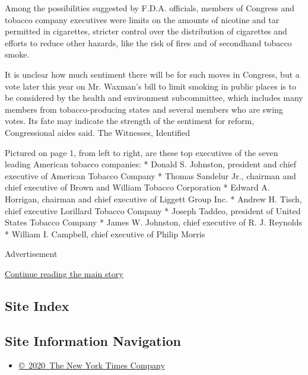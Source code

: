 Among the possibilities suggested by F.D.A. officials, members of
Congress and tobacco company executives were limits on the amounts of
nicotine and tar permitted in cigarettes, stricter control over the
distribution of cigarettes and efforts to reduce other hazards, like the
risk of fires and of secondhand tobacco smoke.

It is unclear how much sentiment there will be for such moves in
Congress, but a vote later this year on Mr. Waxman's bill to limit
smoking in public places is to be considered by the health and
environment subcommittee, which includes many members from
tobacco-producing states and several members who are swing votes. Its
fate may indicate the strength of the sentiment for reform,
Congressional aides said. The Witnesses, Identified

Pictured on page 1, from left to right, are these top executives of the
seven leading American tobacco companies: * Donald S. Johnston,
president and chief executive of American Tobacco Company * Thomas
Sandelur Jr., chairman and chief executive of Brown and William Tobacco
Corporation * Edward A. Horrigan, chairman and chief executive of
Liggett Group Inc. * Andrew H. Tisch, chief executive Lorillard Tobacco
Company * Joseph Taddeo, president of United States Tobacco Company *
James W. Johnston, chief executive of R. J. Reynolds * William I.
Campbell, chief executive of Philip Morris

Advertisement

\protect\hyperlink{after-bottom}{Continue reading the main story}

\hypertarget{site-index}{%
\subsection{Site Index}\label{site-index}}

\hypertarget{site-information-navigation}{%
\subsection{Site Information
Navigation}\label{site-information-navigation}}

\begin{itemize}
\tightlist
\item
  \href{https://help.nytimes3xbfgragh.onion/hc/en-us/articles/115014792127-Copyright-notice}{©~2020~The
  New York Times Company}
\end{itemize}

